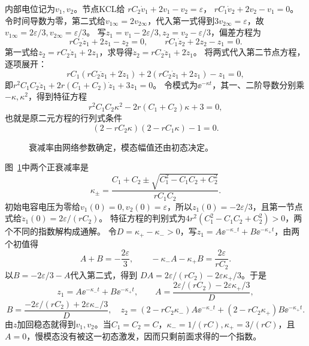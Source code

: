 \begin{solution}
内部电位记为$v_1,v_2$。节点KCL给
$rC_2\dot v_1+2v_1-v_2=\varepsilon$，
$rC_1\dot v_2+2v_2-v_1=0$。
令时间导数为零，第二式给$v_{1\infty}=2v_{2\infty}$，代入第一式得到$3v_{2\infty}=\varepsilon$，故
$v_{1\infty}=2\varepsilon/3,v_{2\infty}=\varepsilon/3$。
写$z_1=v_1-2\varepsilon/3,z_2=v_2-\varepsilon/3$，偏差方程为
\[
 rC_2\dot z_1+2z_1-z_2=0,\qquad
 rC_1\dot z_2+2z_2-z_1=0.
\]
第一式给$z_2=rC_2\dot z_1+2z_1$，求导得$\dot z_2=rC_2\ddot z_1+2\dot z_1$。
将两式代入第二节点方程，逐项展开：
\[
 rC_1(rC_2\ddot z_1+2\dot z_1)
 +2(rC_2\dot z_1+2z_1)-z_1=0,
\]
即$r^2C_1C_2\ddot z_1+2r(C_1+C_2)\dot z_1+3z_1=0$。
令模式为$\ee^{-\kappa t}$，其一、二阶导数分别乘$-\kappa,\kappa^2$，得到特征方程
\[
 r^2C_1C_2\kappa^2-2r(C_1+C_2)\kappa+3=0,
\]
也就是原二元方程的行列式条件
\[
 (2-rC_2\kappa)(2-rC_1\kappa)-1=0.
\]

\begin{figure}[H]\centering
{}
\caption{衰减率由网络参数确定，模态幅值还由初态决定。}\label{fig:c4-unequal-caps-s}
\end{figure}

图~\ref{fig:c4-unequal-caps-s}中两个正衰减率是
\[
 \boxed{\kappa_\pm=
 \frac{C_1+C_2\pm\sqrt{C_1^2-C_1C_2+C_2^2}}
 {rC_1C_2}}.
\]
初始电容电压为零给$v_1(0)=0,v_2(0)=\varepsilon$，所以$z_1(0)=-2\varepsilon/3$，且第一节点式给$\dot z_1(0)=2\varepsilon/(rC_2)$。
特征方程的判别式为$4r^2(C_1^2-C_1C_2+C_2^2)>0$，两个不同的指数解构成通解。
令$D=\kappa_+-\kappa_->0$，写$z_1=A\ee^{-\kappa_-t}+B\ee^{-\kappa_+t}$，由两个初值得
\[
 A+B=-\frac{2\varepsilon}3,\qquad
 -\kappa_-A-\kappa_+B=\frac{2\varepsilon}{rC_2}.
\]
以$B=-2\varepsilon/3-A$代入第二式，得到
$DA=2\varepsilon/(rC_2)-2\varepsilon\kappa_+/3$。于是
\[
 z_1=A\ee^{-\kappa_-t}+B\ee^{-\kappa_+t},\qquad
 A=\frac{2\varepsilon/(rC_2)-2\varepsilon\kappa_+/3}{D},
\]
\[
 B=\frac{-2\varepsilon/(rC_2)+2\varepsilon\kappa_-/3}{D},
\quad
 z_2=(2-rC_2\kappa_-)A\ee^{-\kappa_-t}
 +(2-rC_2\kappa_+)B\ee^{-\kappa_+t}.
\]
由$z$加回稳态就得到$v_1,v_2$。当$C_1=C_2=C$，$\kappa_-=1/(rC),\kappa_+=3/(rC)$，且$A=0$，慢模态没有被这一初态激发，因而只剩前面求得的一个指数。
\end{solution}



